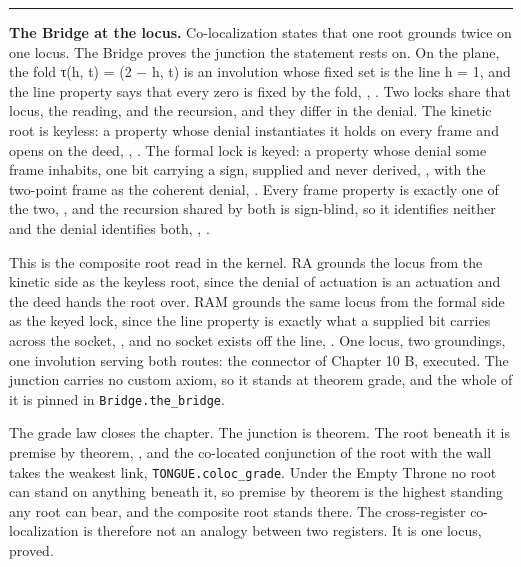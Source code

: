 \documentclass[10pt,twocolumn]{article}
\begin{document}
\begin{center}\rule{0.5\linewidth}{0.5pt}\end{center}

\textbf{The Bridge at the locus.} Co-localization states that one root
grounds twice on one locus. The Bridge proves the junction the statement
rests on. On the plane, the fold τ(h, t) = (2 − h, t) is an involution
whose fixed set is the line h = 1, and the line property says that every
zero is fixed by the fold,
\texttt{},
\texttt{}. Two locks share that
locus, the reading, and the recursion, and they differ in the denial.
The kinetic root is keyless: a property whose denial instantiates it
holds on every frame and opens on the deed,
\texttt{},
\texttt{}. The formal lock is
keyed: a property whose denial some frame inhabits, one bit carrying a
sign, supplied and never derived,
\texttt{}, with the two-point
frame as the coherent denial,
\texttt{}. Every frame property is
exactly one of the two, \texttt{}, and
the recursion shared by both is sign-blind, so it identifies neither and
the denial identifies both,
\texttt{},
\texttt{}.

This is the composite root read in the kernel. RA grounds the locus from
the kinetic side as the keyless root, since the denial of actuation is
an actuation and the deed hands the root over. RAM grounds the same
locus from the formal side as the keyed lock, since the line property is
exactly what a supplied bit carries across the socket,
\texttt{}, and no socket
exists off the line, \texttt{}.
One locus, two groundings, one involution serving both routes: the
connector of Chapter 10 B, executed. The junction carries no custom
axiom, so it stands at theorem grade, and the whole of it is pinned in
\texttt{Bridge.the\_bridge}.

The grade law closes the chapter. The junction is theorem. The root
beneath it is premise by theorem,
\texttt{}, and the co-located
conjunction of the root with the wall takes the weakest link,
\texttt{TONGUE.coloc\_grade}. Under the Empty Throne no root can stand
on anything beneath it, so premise by theorem is the highest standing
any root can bear, and the composite root stands there. The
cross-register co-localization is therefore not an analogy between two
registers. It is one locus, proved.
\end{document}
